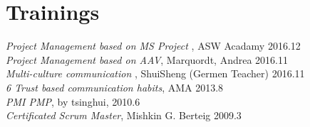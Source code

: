 
\section{Trainings}

{\em Project Management based on MS Project }, ASW Acadamy \hfill 2016.12
\\
{\em Project Management based on AAV}, Marquordt, Andrea \hfill 2016.11
\\
{\em Multi-culture communication }, ShuiSheng (Germen Teacher) \hfill 2016.11
\\
{\em 6 Trust based communication habits}, AMA \hfill 2013.8
\\
{\em PMI PMP}, by tsinghui, \hfill 2010.6
\\
{\em Certificated Scrum Master}, Mishkin G. Berteig \hfill 2009.3


